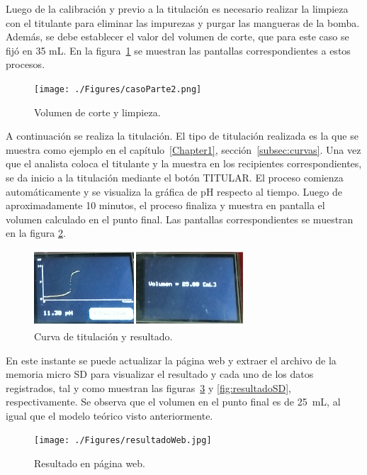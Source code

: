 Luego de la calibración y previo a la titulación es necesario realizar la limpieza con el titulante para eliminar las impurezas y purgar las mangueras de la bomba. Además, se debe establecer el valor del volumen de corte, que para este caso se fijó en 35 mL. En la figura~\ref{fig:casoParte2} se muestran las pantallas correspondientes a estos procesos.

\begin{figure}[htbp]
	\centering
	\texttt{[image: ./Figures/casoParte2.png]}
	\caption{Volumen de corte y limpieza.}
	\label{fig:casoParte2}
\end{figure}

A continuación se realiza la titulación. El tipo de titulación realizada es la que se muestra como ejemplo en el capítulo~\ref{Chapter1}, sección~\ref{subsec:curvas}. Una vez que el analista coloca el titulante y la muestra en los recipientes correspondientes, se da inicio a la titulación mediante el botón TITULAR. El proceso comienza automáticamente y se visualiza la gráfica de pH respecto al tiempo. Luego de aproximadamente 10 minutos, el proceso finaliza y muestra en pantalla el volumen calculado en el punto final. Las pantallas correspondientes se muestran en la figura \ref{fig:casoParte3}.

\begin{figure}[htbp]
	\centering
	\includegraphics[width=0.7\textwidth]{./Figures/casoParte3.png}
	\caption{Curva de titulación y resultado.}
	\label{fig:casoParte3}
\end{figure}

En este instante se puede actualizar la página web y extraer el archivo de la memoria micro SD para visualizar el resultado y cada uno de los datos registrados, tal y como muestran las figuras~\ref{fig:resultadoWeb.jpg} y \ref{fig:resultadoSD}, respectivamente. Se observa que el volumen en el punto final es de 25~mL, al igual que el modelo teórico visto anteriormente.

\begin{figure}[htbp]
	\centering
	\texttt{[image: ./Figures/resultadoWeb.jpg]}
	\caption{Resultado en página web.}
	\label{fig:resultadoWeb.jpg}
\end{figure}

